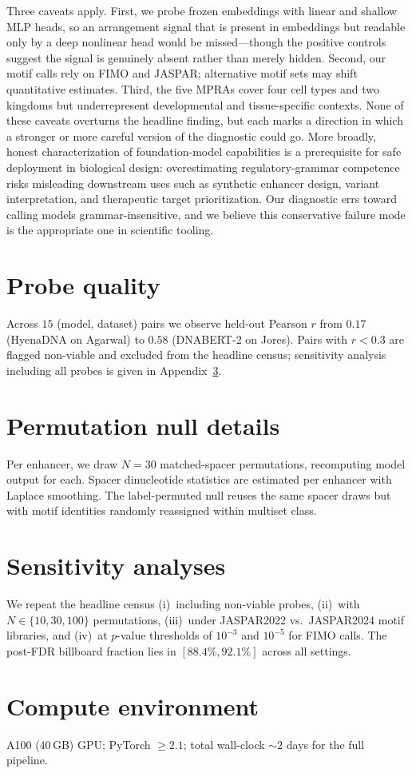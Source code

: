 \documentclass{article}
\begin{document}
Three caveats apply. First, we probe frozen embeddings with linear and shallow MLP heads, so an arrangement signal that is present in embeddings but readable only by a deep nonlinear head would be missed---though the positive controls suggest the signal is genuinely absent rather than merely hidden. Second, our motif calls rely on FIMO and JASPAR; alternative motif sets may shift quantitative estimates. Third, the five MPRAs cover four cell types and two kingdoms but underrepresent developmental and tissue-specific contexts. None of these caveats overturns the headline finding, but each marks a direction in which a stronger or more careful version of the diagnostic could go. More broadly, honest characterization of foundation-model capabilities is a prerequisite for safe deployment in biological design: overestimating regulatory-grammar competence risks misleading downstream uses such as synthetic enhancer design, variant interpretation, and therapeutic target prioritization. Our diagnostic errs toward calling models grammar-insensitive, and we believe this conservative failure mode is the appropriate one in scientific tooling.




\appendix
\section{Probe quality}
\label{app:probes}
Across $15$ (model, dataset) pairs we observe held-out Pearson $r$ from $0.17$ (HyenaDNA on Agarwal) to $0.58$ (DNABERT-2 on Jores). Pairs with $r < 0.3$ are flagged non-viable and excluded from the headline census; sensitivity analysis including all probes is given in Appendix~\ref{app:sensitivity}.

\section{Permutation null details}
\label{app:null}
Per enhancer, we draw $N=30$ matched-spacer permutations, recomputing model output for each. Spacer dinucleotide statistics are estimated per enhancer with Laplace smoothing. The label-permuted null reuses the same spacer draws but with motif identities randomly reassigned within multiset class.

\section{Sensitivity analyses}
\label{app:sensitivity}
We repeat the headline census (i)~including non-viable probes, (ii)~with $N \in \{10, 30, 100\}$ permutations, (iii)~under JASPAR2022 vs.\ JASPAR2024 motif libraries, and (iv)~at $p$-value thresholds of $10^{-3}$ and $10^{-5}$ for FIMO calls. The post-FDR billboard fraction lies in $[88.4\%, 92.1\%]$ across all settings.

\section{Compute environment}
A100 ($40$\,GB) GPU; PyTorch $\geq 2.1$; total wall-clock $\sim 2$ days for the full pipeline.

\newpage

\end{document}
